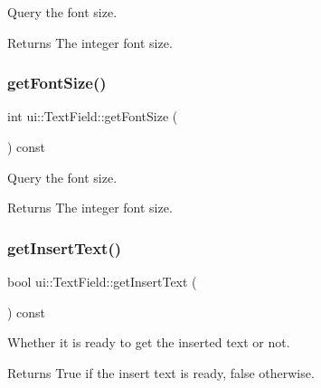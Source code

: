 Query the font size. 

\begin{DoxyReturn}{Returns}
The integer font size. 
\end{DoxyReturn}
\mbox{\label{classui_1_1TextField_a92c02fd871c8c39af214b6796278f09e}} 
\subsubsection{\texorpdfstring{get\+Font\+Size()}{getFontSize()}\hspace{0.1cm}{\footnotesize\ttfamily [2/2]}}
{\footnotesize\ttfamily int ui\+::\+Text\+Field\+::get\+Font\+Size (\begin{DoxyParamCaption}{ }\end{DoxyParamCaption}) const}



Query the font size. 

\begin{DoxyReturn}{Returns}
The integer font size. 
\end{DoxyReturn}
\mbox{\label{classui_1_1TextField_a627e0f88f89ac842204f48b5fc530518}} 
\subsubsection{\texorpdfstring{get\+Insert\+Text()}{getInsertText()}\hspace{0.1cm}{\footnotesize\ttfamily [1/2]}}
{\footnotesize\ttfamily bool ui\+::\+Text\+Field\+::get\+Insert\+Text (\begin{DoxyParamCaption}{ }\end{DoxyParamCaption}) const}



Whether it is ready to get the inserted text or not. 

\begin{DoxyReturn}{Returns}
True if the insert text is ready, false otherwise. 
\end{DoxyReturn}
\mbox{\label{classui_1_1TextField_a627e0f88f89ac842204f48b5fc530518}} 

